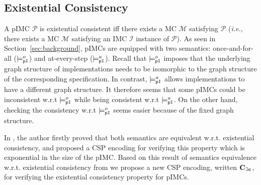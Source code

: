 \documentclass{llncs}
\newcommand{\mc}{\textnormal{MC}}
\newcommand{\imc}{\textnormal{IMC}}
\newcommand{\pimc}{\textnormal{pIMC}}
\newcommand{\csp}{\textnormal{CSP}}
\newcommand{\satisfactionPimc}{\ensuremath{\models^a_{\tt{pI}}}}
\newcommand{\satisfactionPimcOnce}{\ensuremath{\models^o_{\tt{pI}}}}
\newcommand{\Mec} {\ensuremath{{\bf C_{{\exists}c}}}}
\newcommand{\ie} {{\em i.e.},\ }
\newcommand{\comment}[2]{{\color{gray}{\small{\underline{#1:} #2}}}}
\newcommand{\eric}[1]{\marginpar{\comment{\'Eric}{#1}}}%
\newcommand{\benoit}[1]{\marginpar{\comment{Beno\^it}{#1}}}%
\begin{document}
\subsection{Existential Consistency}


A {\pimc} $\mathcal{P}$ is existential consistent iff 
there exists a {\mc} $\mathcal{M}$ satisfying $\mathcal{P}$ (\ie
there exists a {\mc} $\mathcal{M}$ satisfying an {\imc} $\mathcal{I}$ instance of $\mathcal{P}$).
%
%
%
As seen in Section~\ref{sec:background}, {\pimc}s are equipped with two
semantics: once-and-for-all ($\satisfactionPimcOnce$) and
at-every-step ($\satisfactionPimc$). Recall that
$\satisfactionPimcOnce$ imposes that the underlying graph structure of
implementations needs to be isomorphic to the graph structure of the
corresponding specification. In contrast, $\satisfactionPimc$ allows
implementations to have a different graph structure. It therefore
seems that some {\pimc}s could be inconsistent w.r.t
$\satisfactionPimcOnce$ while being consistent w.r.t
$\satisfactionPimc$. On the other hand, checking the consistency w.r.t
$\satisfactionPimcOnce$ seems easier because of the fixed graph
structure.


In \cite{Delahaye15}, the author firstly proved that both semantics are equivalent
w.r.t. existential consistency, and proposed a {\csp} encoding for verifying this property
which is exponential in the size of the {\pimc}.
Based on this result of semantics equivalence
w.r.t. existential consistency from \cite{Delahaye15}
we propose a new {\csp} encoding, written
{\Mec}, for verifying the existential consistency property for
{\pimc}s.



\end{document}
